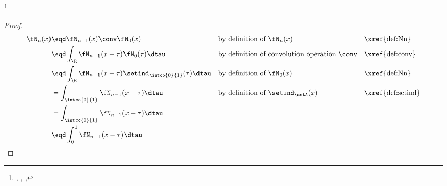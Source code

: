 \begin{lemma}
\footnote{
  ,
  ,
  ,
  }
\label{lem:Nn}
\end{lemma}
\begin{proof}
  \begin{align*}
    \fN_{n}(x)
      &\eqd \fN_{n-1}(x)\conv\fN_0(x)
      && \text{by definition of $\fN_n(x)$}
      && \text{\xref{def:Nn}}
    \\&\eqd \int_\R\fN_{n-1}(x-\tau)\fN_0(\tau)\dtau
      && \text{by definition of convolution operation $\conv$}
      && \text{\xref{def:conv}}
    \\&\eqd \int_\R\fN_{n-1}(x-\tau)\setind_\intco{0}{1}(\tau)  \dtau
      && \text{by definition of $\fN_0(x)$}
      && \text{\xref{def:Nn}}
    \\&= \int_\intco{0}{1} \fN_{n-1}(x-\tau)\dtau
      && \text{by definition of $\setind_\setA(x)$}
      && \text{\xref{def:setind}}
    \\&= \int_\intcc{0}{1} \fN_{n-1}(x-\tau)\dtau
    \\&\eqd \int_0^1 \fN_{n-1}(x-\tau)\dtau
  \end{align*}
\end{proof}


